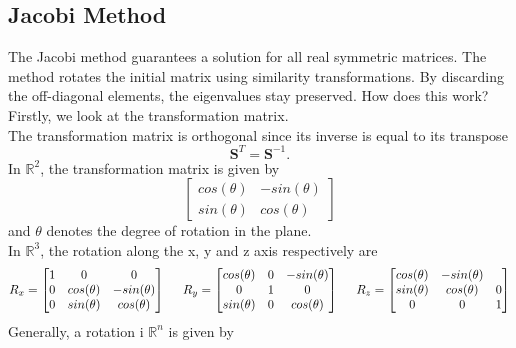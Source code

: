 \documentclass[%
oneside,                 %
final,                   %
10pt]{article}
\newcommand{\R}{\mathbb{R}}
\begin{document}
\subsection{Jacobi Method}
The Jacobi method guarantees a solution for all real symmetric matrices. 
The method rotates the initial matrix using similarity transformations. By discarding the off-diagonal elements, the eigenvalues stay preserved.
How does this work? Firstly, we look at the transformation matrix. \\
The transformation matrix is orthogonal since its inverse is equal to its transpose
\begin{equation*}
\mathbf{S}^T = \mathbf{S}^{-1}.
\end{equation*}
In $\R^2$, the transformation matrix is given by
\[
     \begin{bmatrix}
     				cos(\theta) & -sin(\theta) \\
					sin(\theta) & cos(\theta)
                      \end{bmatrix}
\]
and $\theta$ denotes the degree of rotation in the plane. \\
In $\R^3$, the rotation along the x, y and z axis respectively are 
\[
    R_x = \begin{bmatrix}
     				1 			&	0 			&0				\\
     				0			&	cos(\theta) & -sin(\theta) \\
					0			&	sin(\theta) & cos(\theta)
                      \end{bmatrix}
	\hspace{0.5cm} R_y = \begin{bmatrix}
     				cos(\theta)&	0 			& -sin(\theta)		\\
     				0			&	1 			& 0 				\\
					sin(\theta)	&	0			& cos(\theta)
                      \end{bmatrix}
	\hspace{0.5cm} R_z = \begin{bmatrix}
     				cos(\theta)& -sin(\theta)	& 	\\
     				sin(\theta)	& cos(\theta) 	& 0 \\
						0		&	0			& 1
                      \end{bmatrix}
\]
Generally, a rotation i $\R^n$ is given by 
\end{document}
